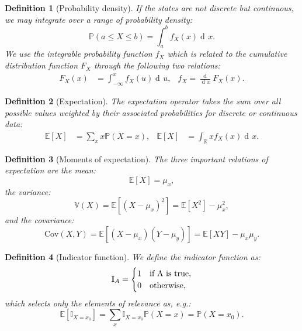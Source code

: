 \documentclass{article}
\newtheorem{definition}{Definition}
\DeclareMathOperator{\di}{d\!}
\begin{document}
\begin{definition}[Probability density]
    If the states are not discrete but continuous, we may integrate over a range of probability density:
    \begin{equation}
        \mathbb{P}(a\leq X \leq b) = \int_{a}^b f_X(x)\di x.
    \end{equation}
    We use the integrable probability function $f_X$ which is related to the cumulative distribution function $F_X$ through the following two relations:
    \begin{align}
        F_X(x) &= \int_{-\infty}^x f_X(u)\di u,& f_X = \frac{\di}{\di x}F_X(x).
    \end{align}
\end{definition}
\begin{definition}[Expectation]
    The expectation operator takes the sum over all possible values weighted by their associated probabilities for discrete or continuous data:
    \begin{align}
        \mathbb{E}[X] &= \sum_x x\mathbb{P}(X=x),& \mathbb{E}[X] &=\int_\mathbb{R} x f_X(x)\di x.
    \end{align}
\end{definition}
\begin{definition}[Moments of expectation]
    The three important relations of expectation are the mean:
    \begin{equation}
        \mathbb{E}[X] = \mu_x,
    \end{equation}
    the variance:
    \begin{equation}
        \mathbb{V}(X)=\mathbb{E}[(X-\mu_x)^2] = \mathbb{E}[X^2] - \mu_x^2,
    \end{equation}
    and the covariance:
    \begin{equation}
        \text{Cov}(X,Y)=\mathbb{E}[(X-\mu_x)(Y-\mu_y)] = \mathbb{E}[XY]-\mu_x\mu_y.
    \end{equation}
\end{definition}
\begin{definition}[Indicator function]
    We define the indicator function as:
    \begin{equation}
        \mathbb{I}_A = \begin{cases} 1 & \text{if}\ $A$\text{ is true},\\ 0 & \text{otherwise}, \end{cases}
    \end{equation}
    which selects only the elements of relevance as, e.g.:
    \begin{equation}
        \mathbb{E}[\mathbb{I}_{X=x_0}]=\sum_x \mathbb{I}_{X=x_0}\mathbb{P}(X=x) = \mathbb{P}(X=x_0). 
    \end{equation}
\end{definition}
\end{document}
